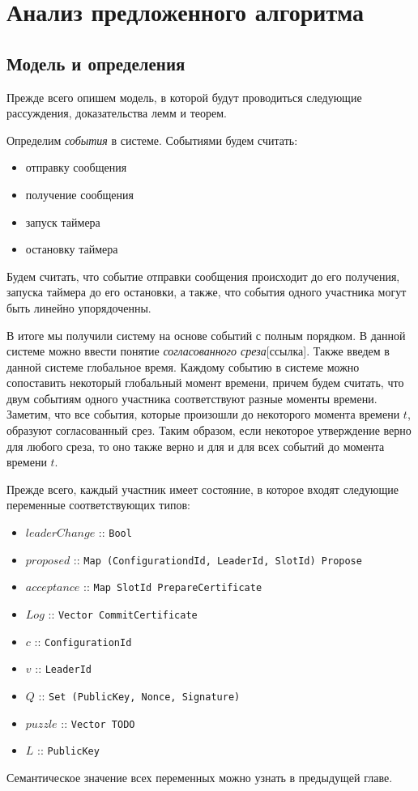
\chapter{Анализ предложенного алгоритма}  \label{chapter3}

\section{Модель и определения}
Прежде всего опишем модель, в которой будут проводиться следующие рассуждения, доказательства лемм и теорем.

Определим \textit{события} в системе. Событиями будем считать:
\begin{itemize}
\item отправку сообщения
\item получение сообщения
\item запуск таймера
\item остановку таймера
\end{itemize}

Будем считать, что событие отправки сообщения происходит до его получения, запуска таймера до его остановки, а также, что события одного участника могут быть линейно упорядоченны.

В итоге мы получили систему на основе событий с полным порядком. В данной системе можно ввести понятие \textit{согласованного среза}[ссылка]. Также введем в данной системе глобальное время. Каждому событию в системе можно сопоставить некоторый глобальный момент времени, причем будем считать, что двум событиям одного участника соответствуют разные моменты времени. Заметим, что все события, которые произошли до некоторого момента времени $t$, образуют согласованный срез. Таким образом, если некоторое утверждение верно для любого среза, то оно также верно и для и для всех событий до момента времени $t$.

Прежде всего, каждый участник имеет состояние, в которое входят следующие переменные соответствующих типов:
\begin{itemize}
\item $leaderChange$ :: \texttt{Bool}
\item $proposed$ :: \texttt{Map (ConfigurationdId, LeaderId, SlotId) Propose}
\item $acceptance$ ::  \texttt{Map SlotId PrepareCertificate}
\item $Log$      :: \texttt{Vector CommitCertificate}
\item $c$          :: \texttt{ConfigurationId}
\item $v$          :: \texttt{LeaderId}
\item $Q$         :: \texttt{Set (PublicKey, Nonce, Signature)}
\item $puzzle$ :: \texttt{Vector TODO}
\item $L$          :: \texttt{PublicKey}
\end{itemize}
Семантическое значение всех переменных можно узнать в предыдущей главе.

